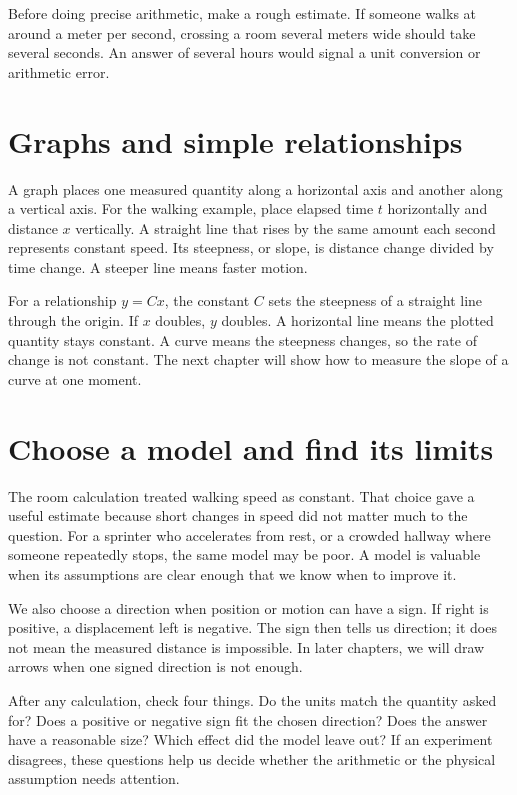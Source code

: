 \documentclass[11pt,oneside]{book}
\theoremstyle{reviewstyle}
\begin{document}
Before doing precise arithmetic, make a rough estimate. If someone walks at around a meter per second, crossing a room several meters wide should take several seconds. An answer of several hours would signal a unit conversion or arithmetic error.

\section{Graphs and simple relationships}
A graph places one measured quantity along a horizontal axis and another along a vertical axis. For the walking example, place elapsed time $t$ horizontally and distance $x$ vertically. A straight line that rises by the same amount each second represents constant speed. Its steepness, or slope, is distance change divided by time change. A steeper line means faster motion.

For a relationship $y=Cx$, the constant $C$ sets the steepness of a straight line through the origin. If $x$ doubles, $y$ doubles. A horizontal line means the plotted quantity stays constant. A curve means the steepness changes, so the rate of change is not constant. The next chapter will show how to measure the slope of a curve at one moment.

\section{Choose a model and find its limits}
The room calculation treated walking speed as constant. That choice gave a useful estimate because short changes in speed did not matter much to the question. For a sprinter who accelerates from rest, or a crowded hallway where someone repeatedly stops, the same model may be poor. A model is valuable when its assumptions are clear enough that we know when to improve it.

We also choose a direction when position or motion can have a sign. If right is positive, a displacement left is negative. The sign then tells us direction; it does not mean the measured distance is impossible. In later chapters, we will draw arrows when one signed direction is not enough.

After any calculation, check four things. Do the units match the quantity asked for? Does a positive or negative sign fit the chosen direction? Does the answer have a reasonable size? Which effect did the model leave out? If an experiment disagrees, these questions help us decide whether the arithmetic or the physical assumption needs attention.
\end{document}
